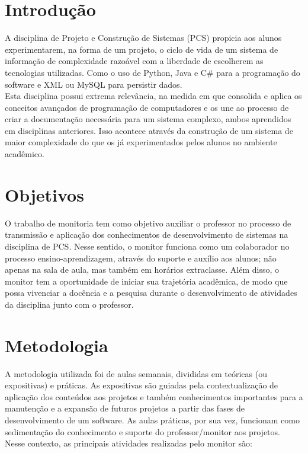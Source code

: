 \documentclass[a0, portrait, final]{a0poster}
\begin{document}
\begin{multicols}{3}

\section{Introdução}
\begin{spacing}{3.0}
{\large A disciplina de Projeto e Construção de Sistemas (PCS) propicia aos alunos experimentarem, na forma de um projeto, o ciclo de vida de um sistema de informação de complexidade razoável com a liberdade de escolherem as tecnologias utilizadas. Como o uso de Python, Java e C# para a programação do software e XML ou MySQL para persistir dados. 
\\ Esta disciplina possui extrema relevância, na medida em que consolida e aplica os conceitos avançados de programação de computadores e os une ao processo de criar a documentação necessária para um sistema complexo, ambos aprendidos em disciplinas anteriores. Isso acontece através da construção de um sistema de maior complexidade do que os já experimentados pelos alunos no ambiente acadêmico.}
\end{spacing}

\section{Objetivos}
\begin{spacing}{3.0}
{\large O trabalho de monitoria tem como objetivo auxiliar o professor no processo de transmissão e aplicação dos conhecimentos de desenvolvimento de sistemas na disciplina de PCS. Nesse sentido, o monitor funciona como um colaborador no processo ensino-aprendizagem, através do suporte e auxílio aos alunos; não apenas na sala de aula, mas também em horários extraclasse. Além disso, o monitor tem a oportunidade de iniciar sua trajetória acadêmica, de modo que possa vivenciar a docência e a pesquisa durante o desenvolvimento de atividades da disciplina junto com o professor. }
\end{spacing}

\section{Metodologia}
\begin{spacing}{3.0}
{\large A metodologia utilizada foi de aulas semanais, divididas em teóricas (ou expositivas) e práticas. As expositivas são guiadas pela contextualização de aplicação dos conteúdos aos projetos e também conhecimentos importantes para a manutenção e a expansão de futuros projetos a partir das fases de desenvolvimento de um software. As aulas práticas, por sua vez, funcionam como sedimentação do conhecimento e suporte do professor/monitor aos projetos.
\\ Nesse contexto, as principais atividades realizadas pelo monitor são:
}
\end{spacing}


\end{multicols}
\end{document}
